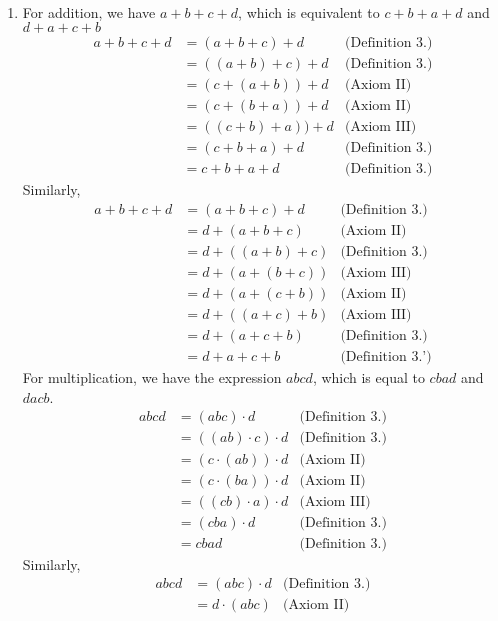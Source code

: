 \documentclass[12pt]{book}
\theoremstyle{definition}
\begin{document}
\begin{sol}
\
\begin{enumerate}[label=(\roman*)]
	\item For addition, we have $a+b+c+d$, which is equivalent to $c+b+a +d$ and $d+a+c+b$
		\begin{align*}
			a+b+c+d &=(a+b+c)+d 	& \text{(Definition 3.)}\\
			&= ((a+b)+c)+d & \text{(Definition 3.)} \\
			&= (c+(a+b))+d & \text{(Axiom II)}\\
			&= (c+(b+a))+d & \text{(Axiom II)}\\
			&= ((c+b)+a))+d & \text{(Axiom III)}\\
			&= (c+b+a)+d & \text{(Definition 3.)}\\
			&= c+b+a+d & \text{(Definition 3.)}
		\end{align*}
		Similarly,
		\begin{align*}
			a+b+c+d &=(a+b+c)+d 	& \text{(Definition 3.)}\\
			&= d+(a+b+c) & \text{(Axiom II)}\\
			&= d+((a+b)+c) &\text{(Definition 3.)}\\
			&= d+(a+(b+c)) & \text{(Axiom III)}\\
			&= d+(a+(c+b)) & \text{(Axiom II)}\\
			&= d+((a+c)+b) & \text{(Axiom III)}\\
			&= d+(a+c+b) & \text{(Definition 3.)}\\
			&= d+a+c+b & \text{(Definition 3.')}
		\end{align*}
		For multiplication, we have the expression $abcd$, which is equal to $cbad$ and $dacb$.
		\begin{align*}
			abcd &= (abc)\cdot d	 	& \text{(Definition 3.)}\\
			&= ((ab)\cdot c)\cdot d 	& \text{(Definition 3.)}\\
			&= (c\cdot (ab))\cdot d 	& \text{(Axiom II)}\\
			&= (c\cdot (ba))\cdot d & \text{(Axiom II)}\\
			&= ((cb)\cdot a)\cdot d & \text{(Axiom III)}\\
			&= (cba)\cdot d & \text{(Definition 3.)}\\
			&= cbad & \text{(Definition 3.)}
		\end{align*}
		Similarly, 
		\begin{align*}
			abcd &= (abc)\cdot d	 	& \text{(Definition 3.)}\\
			&= d\cdot (abc) &\text{(Axiom II)}\\

\end{align*}
\end{enumerate}
\end{sol}
\end{document}
